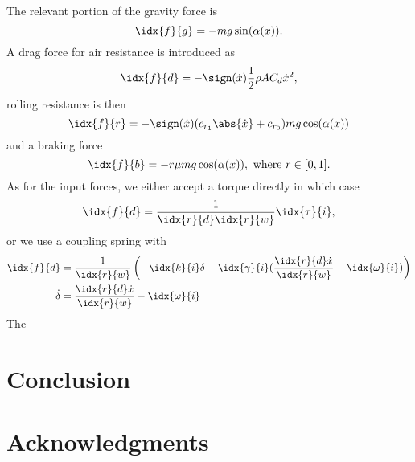\documentclass[10pt,notitlepage,abstracton]{scrartcl}
\theoremstyle{plain}
\theoremstyle{plain}
\theoremstyle{plain}
\begin{document}
The relevant portion of the gravity force is
\begin{equation}
  \label{eq:1}
  \idx{f}{g} = - m g \sin(\alpha ( x ) ).
\end{equation}
A drag force for air resistance is introduced as
\begin{equation}
  \label{eq:2}
  \idx{f}{d} = - \sign(\dot{x}) \frac{1}{2}\rho A C_{d} \dot{x}^{2},  
\end{equation}
rolling resistance is then
\begin{equation}
  \label{eq:3}
 \idx{f}{r} = - \sign(\dot{x})(c_{r_{1}}\abs{\dot{x}} + c_{r_{0}}) m g \cos(\alpha(x))
\end{equation}
and a braking force
\begin{equation}
  \label{eq:4}
  \idx{f}{b} = - r \mu m g \cos(\alpha(x)), \text{ where }   r\in[0,1].
\end{equation}
As for the input forces, we either accept a torque directly in which case
\begin{equation}
  \label{eq:5}
  \idx{f}{d} = \frac{1}{\idx{r}{d}\idx{r}{w}}\idx{\tau}{i}, 
\end{equation}
or we use a coupling spring with
\begin{equation}
  \label{eq:6}
  \begin{split}
    \idx{f}{d} &= \frac{1}{\idx{r}{w}} \left( -\idx{k}{i} \delta -
      \idx{\gamma}{i}( \frac{\idx{r}{d}\dot{x}}{\idx{r}{w}} - \idx{\omega}{i}
      )
    \right) \\
    \dot{\delta} &= \frac{\idx{r}{d}\dot{x}}{\idx{r}{w}} - \idx{\omega}{i}
  \end{split}
\end{equation}
The 






\section{Conclusion}
\label{sec:conclusion}

\section*{Acknowledgments}
\label{sec:acknowledgments}


  

\end{document}
